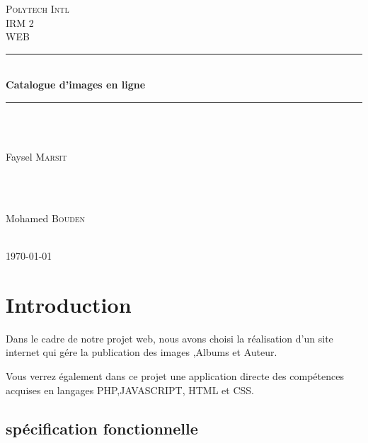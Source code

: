 \documentclass[12pt]{article}
\begin{document}
	\begin{titlepage}
		\newcommand{\HRule}{\rule{\linewidth}{0.5mm}} 

		\center 
 		
 		\textsc{\LARGE Polytech Intl}\\[1.5cm] 
		\textsc{\Large IRM 2}\\[0.5cm] 
		\textsc{\large WEB}\\[0.5cm]
		
		
		\HRule \\[0.6cm]
		{ \huge \bfseries Catalogue d'images en ligne}\\[0.4cm] 
		\HRule \\[1.5cm]
		
		\begin{minipage}{0.4\textwidth}
		\begin{flushleft} \large
		\emph{}\\
		Faysel \textsc{Marsit} %
		\end{flushleft}
		\end{minipage}
		~
		\begin{minipage}{0.4\textwidth}
		\begin{flushright} \large
		\emph{}\\
		Mohamed \textsc{Bouden} %
		\end{flushright}
		\end{minipage}\\[2cm]
	
		{\large \today}\\[2cm]
		
		\vfill
		
	
	
	
	\end{titlepage} %


	\section{Introduction}
	Dans le cadre de notre projet web, nous avons choisi la réalisation d’un site internet qui gére la publication des images ,Albums et Auteur.
	
	
	Vous verrez également dans ce projet une application directe des compétences acquises en langages PHP,JAVASCRIPT, HTML et CSS.
	
	
	\subsection{spécification fonctionnelle}
\end{document}
